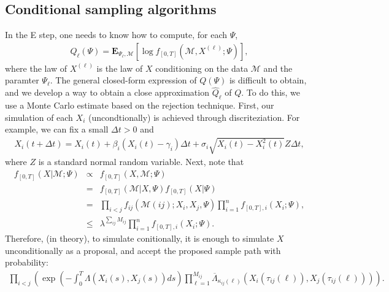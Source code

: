 \documentclass[12pt]{article}%
\begin{document}
\subsection{Conditional sampling algorithms}
In the E step, one needs to know how to compute, for each $\Psi$,
\begin{eqnarray}
Q_\ell(\Psi) = \mathbf E_{\Psi_\ell,\mathcal M}\left[ \log f_{[0,T]}(\mathcal M, X^{(\ell)};\Psi)\right],
\end{eqnarray}
where the law of $X^{(\ell)}$ is the law of $X$ conditioning on the data $\mathcal M$ and the paramter $\Psi_\ell$.  The general closed-form expression of $Q(\Psi)$ is difficult to obtain, and we develop a way to obtain a close approximation $\widehat{Q}_\ell$ of $Q$.  To do this, we use a Monte Carlo estimate based on the rejection technique.  First, our simulation of each $X_i$ (uncondtionally) is achieved through discriteziation.  For example, we can fix a small $\Delta t > 0$ and 
\begin{eqnarray}
X_i(t+\Delta t) = X_i(t) + \beta_i(X_i(t) - \gamma_i) \Delta t + \sigma_i \sqrt{X_i(t) - X_i^2(t)} Z \Delta t,
\end{eqnarray}
where $Z$ is a standard normal random variable.  
Next, note that 
\begin{eqnarray}
f_{[0,T]}(X\left|\mathcal M\right.;\Psi) 
&\propto& f_{[0,T]}(X,\mathcal M;\Psi) \\
&=& f_{[0,T]}(\mathcal M\left|X,\Psi\right.) f_{[0,T]}(X\left|\Psi\right.)\\
&=& \prod_{i<j} f_{ij}(\mathcal M(ij);X_i,X_j,\Psi) \prod_{i=1}^n f_{[0,T],i}(X_i;\Psi),\\
&\le & \lambda^{\sum_{ij}M_{ij}} \prod_{i=1}^n f_{[0,T],i}(X_i;\Psi).
\end{eqnarray}
Therefore, (in theory), to simulate conitionally, it is enough to simulate 
$X$ unconditionally as a proposal, and accept the proposed sample path
with probability:
\begin{eqnarray}
\prod_{i<j} \left(
\exp\left(-\int_{0}^{T} \Lambda(X_i(s),X_j(s)) ds\right)
\prod_{\ell=1}^{M_{ij}}\overline{\Lambda}_{\kappa_{ij}(\ell)}(X_i(\tau_{ij}(\ell)),X_j(\tau_{ij}(\ell)))
\right)
. 
\end{eqnarray}
\end{document}
